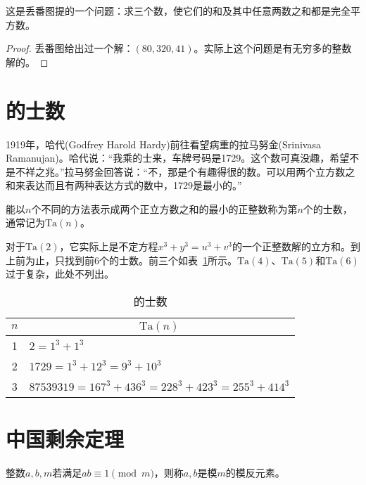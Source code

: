 \begin{example}
  这是丢番图提的一个问题：求三个数，使它们的和及其中任意两数之和都是完全平方数。
\end{example}
\begin{proof}
  丢番图给出过一个解：$(80,320,41)$。实际上这个问题是有无穷多的整数解的。
\end{proof}


\section{的士数}
\label{sec:taxicab-number}

1919年，哈代(Godfrey Harold Hardy)前往看望病重的拉马努金(Srinivasa Ramanujan)。哈代说：“我乘的士来，车牌号码是1729。这个数可真没趣，希望不是不祥之兆。”拉马努金回答说：“不，那是个有趣得很的数。可以用两个立方数之和来表达而且有两种表达方式的数中，1729是最小的。”

\begin{definition}
  能以$n$个不同的方法表示成两个正立方数之和的最小的正整数称为第$n$个的士数，通常记为$\mathrm{Ta}(n)$。
\end{definition}

对于$\mathrm{Ta}(2)$，它实际上是不定方程$x^3+y^3=u^3+v^3$的一个正整数解的立方和。到上前为止，只找到前6个的士数。前三个如表~\ref{tab:taxicab-number}所示。$\mathrm{Ta}(4)$、$\mathrm{Ta}(5)$和$\mathrm{Ta}(6)$过于复杂，此处不列出。
\begin{table}[htbp]
  \centering
  \begin{tabular}{cl}
    \toprule
    $n$              & \multicolumn{1}{c}{$\mathrm{Ta}(n)$}\\\midrule
    1                & $2 = 1^3 + 1^3$\\
    2                & $1729=1^3+12^3=9^3+10^3$\\
    3                & $87539319=167^3+436^3=228^3+423^3=255^3+414^3$\\
    \bottomrule
  \end{tabular}
  \caption{的士数}
  \label{tab:taxicab-number}
\end{table}

\section{中国剩余定理}
\label{sec:Chinese-remainder-theorem}

\begin{definition}
  整数$a,b,m$若满足$ab\equiv1\pmod m$，则称$a,b$是模$m$的模反元素。
\end{definition}

